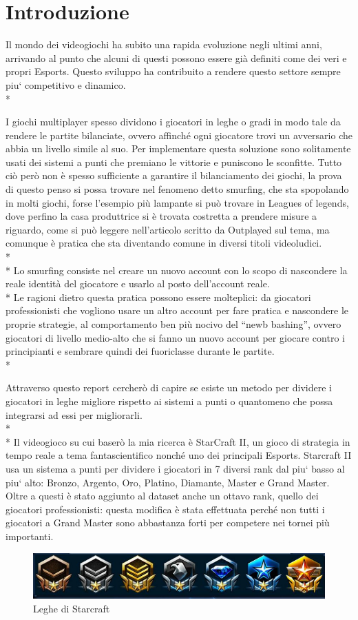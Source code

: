 \section{Introduzione}\label{sec:introduzione}
\normalsize
Il mondo dei videogiochi ha subito una rapida evoluzione negli ultimi anni, arrivando al punto che alcuni di questi possono essere già definiti come dei veri e propri Esports. Questo sviluppo ha contribuito a rendere questo settore sempre piu` competitivo e dinamico.\\*\par
I giochi multiplayer spesso dividono i giocatori in leghe o gradi in modo tale da rendere le partite bilanciate, ovvero affinché ogni giocatore trovi un avversario che abbia un livello simile al suo. Per implementare questa soluzione sono solitamente usati dei sistemi a punti che premiano le vittorie e puniscono le sconfitte.
Tutto ciò però non è spesso sufficiente a garantire il bilanciamento dei giochi, la prova di questo penso si possa trovare nel fenomeno detto smurfing, che sta spopolando in molti giochi, forse l'esempio più lampante si può trovare in Leagues of legends, dove perfino la casa produttrice si è trovata costretta a prendere misure a riguardo, come si può leggere nell'articolo scritto da Outplayed sul tema\cite{Outplayed}, ma comunque è pratica che sta diventando comune in diversi titoli videoludici.
\\*\\*
Lo smurfing consiste nel creare un nuovo account con lo scopo di nascondere la reale identità del giocatore e usarlo al posto dell'account reale.\\*
Le ragioni dietro questa pratica possono essere molteplici: da giocatori professionisti che vogliono usare un altro account per fare pratica e nascondere le proprie strategie, al comportamento ben più nocivo del “newb bashing”, ovvero giocatori di livello medio-alto che si fanno un nuovo account per giocare contro i principianti e sembrare quindi dei fuoriclasse durante le partite. \\*\par
Attraverso questo report cercherò di capire se esiste un metodo per dividere i giocatori in leghe migliore rispetto ai sistemi a punti o quantomeno che possa integrarsi ad essi per migliorarli.\\*\\*
Il videogioco su cui baserò la mia ricerca è StarCraft II, un gioco di strategia in tempo reale a tema fantascientifico nonché uno dei principali Esports. Starcraft II usa un sistema a punti per dividere i giocatori in 7 diversi rank dal piu` basso al piu` alto: Bronzo, Argento, Oro, Platino, Diamante, Master e Grand Master. Oltre a questi è stato aggiunto al dataset anche un ottavo rank, quello dei giocatori professionisti:
questa modifica è stata effettuata perché non tutti i giocatori a Grand Master sono abbastanza forti per competere nei tornei più importanti. 
\begin{figure}[h]
	\includegraphics[scale=0.74]{../figures/ranks starcraft II.PNG}
	\caption{Leghe di Starcraft} 
\end{figure}
